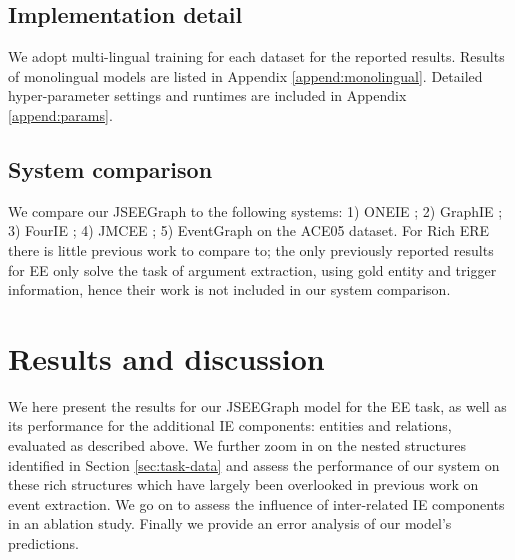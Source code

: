 \documentclass[11pt]{article}
\begin{document}
\subsection{Implementation detail}

We adopt multi-lingual training for each dataset for the reported results. Results of monolingual models are listed in Appendix \ref{append:monolingual}. Detailed hyper-parameter settings and runtimes are included in Appendix \ref{append:params}.

\subsection{System comparison}

We compare our JSEEGraph to the following systems: 1) ONEIE \citep{lin-etal-2020-joint}; 2) GraphIE \citep{nguyen-etal-2022-joint}; 3) FourIE \citep{nguyen-etal-2021-cross}; 4) JMCEE \citep{xu-etal-2020-novel}; 5) EventGraph \citep{you2022eventgraph} on the ACE05 dataset. For Rich ERE there is little previous work to compare to; the only previously reported results \citep{li2022dual} for EE only solve the task of argument extraction, using gold entity and trigger information, hence their work is not included in our system comparison.

\section{Results and discussion}
\label{sec:results}
We here present the results for our JSEEGraph model for the EE task, as well as its performance for the additional IE components: entities and relations, evaluated as described above. We further zoom in on the nested structures identified in Section \ref{sec:task-data} and assess the performance of our system on these rich structures which have largely been overlooked in previous work on event extraction. We go on to assess the influence of inter-related IE components in an ablation study. Finally we provide an error analysis of our model's predictions.
\end{document}
